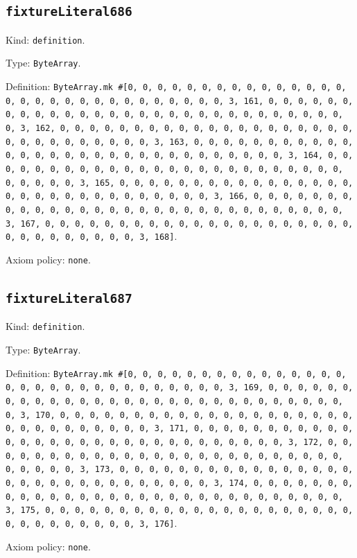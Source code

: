 \documentclass[11pt]{article}
\begin{document}
\subsection*{\texttt{fixtureLiteral686}}
\noindent Kind: \texttt{definition}.\par
\noindent Type: \texttt{ByteArray}.\par
\noindent Definition: \texttt{ByteArray.mk \#[0, 0, 0, 0, 0, 0, 0, 0, 0, 0, 0, 0, 0, 0, 0, 0, 0, 0, 0, 0, 0, 0, 0, 0, 0, 0, 0, 0, 0, 0, 3, 161, 0, 0, 0, 0, 0, 0, 0, 0, 0, 0, 0, 0, 0, 0, 0, 0, 0, 0, 0, 0, 0, 0, 0, 0, 0, 0, 0, 0, 0, 0, 3, 162, 0, 0, 0, 0, 0, 0, 0, 0, 0, 0, 0, 0, 0, 0, 0, 0, 0, 0, 0, 0, 0, 0, 0, 0, 0, 0, 0, 0, 0, 0, 3, 163, 0, 0, 0, 0, 0, 0, 0, 0, 0, 0, 0, 0, 0, 0, 0, 0, 0, 0, 0, 0, 0, 0, 0, 0, 0, 0, 0, 0, 0, 0, 3, 164, 0, 0, 0, 0, 0, 0, 0, 0, 0, 0, 0, 0, 0, 0, 0, 0, 0, 0, 0, 0, 0, 0, 0, 0, 0, 0, 0, 0, 0, 0, 3, 165, 0, 0, 0, 0, 0, 0, 0, 0, 0, 0, 0, 0, 0, 0, 0, 0, 0, 0, 0, 0, 0, 0, 0, 0, 0, 0, 0, 0, 0, 0, 3, 166, 0, 0, 0, 0, 0, 0, 0, 0, 0, 0, 0, 0, 0, 0, 0, 0, 0, 0, 0, 0, 0, 0, 0, 0, 0, 0, 0, 0, 0, 0, 3, 167, 0, 0, 0, 0, 0, 0, 0, 0, 0, 0, 0, 0, 0, 0, 0, 0, 0, 0, 0, 0, 0, 0, 0, 0, 0, 0, 0, 0, 0, 0, 3, 168]}.\par
\noindent Axiom policy: \texttt{none}.\par
\subsection*{\texttt{fixtureLiteral687}}
\noindent Kind: \texttt{definition}.\par
\noindent Type: \texttt{ByteArray}.\par
\noindent Definition: \texttt{ByteArray.mk \#[0, 0, 0, 0, 0, 0, 0, 0, 0, 0, 0, 0, 0, 0, 0, 0, 0, 0, 0, 0, 0, 0, 0, 0, 0, 0, 0, 0, 0, 0, 3, 169, 0, 0, 0, 0, 0, 0, 0, 0, 0, 0, 0, 0, 0, 0, 0, 0, 0, 0, 0, 0, 0, 0, 0, 0, 0, 0, 0, 0, 0, 0, 3, 170, 0, 0, 0, 0, 0, 0, 0, 0, 0, 0, 0, 0, 0, 0, 0, 0, 0, 0, 0, 0, 0, 0, 0, 0, 0, 0, 0, 0, 0, 0, 3, 171, 0, 0, 0, 0, 0, 0, 0, 0, 0, 0, 0, 0, 0, 0, 0, 0, 0, 0, 0, 0, 0, 0, 0, 0, 0, 0, 0, 0, 0, 0, 3, 172, 0, 0, 0, 0, 0, 0, 0, 0, 0, 0, 0, 0, 0, 0, 0, 0, 0, 0, 0, 0, 0, 0, 0, 0, 0, 0, 0, 0, 0, 0, 3, 173, 0, 0, 0, 0, 0, 0, 0, 0, 0, 0, 0, 0, 0, 0, 0, 0, 0, 0, 0, 0, 0, 0, 0, 0, 0, 0, 0, 0, 0, 0, 3, 174, 0, 0, 0, 0, 0, 0, 0, 0, 0, 0, 0, 0, 0, 0, 0, 0, 0, 0, 0, 0, 0, 0, 0, 0, 0, 0, 0, 0, 0, 0, 3, 175, 0, 0, 0, 0, 0, 0, 0, 0, 0, 0, 0, 0, 0, 0, 0, 0, 0, 0, 0, 0, 0, 0, 0, 0, 0, 0, 0, 0, 0, 0, 3, 176]}.\par
\noindent Axiom policy: \texttt{none}.\par
\end{document}
